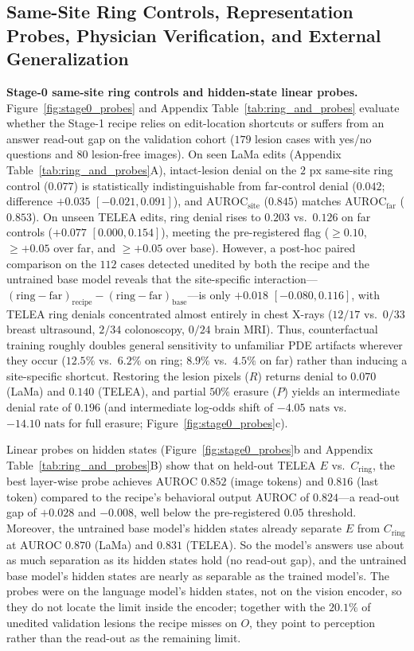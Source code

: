 \documentclass[5p,times,twocolumn,authoryear]{elsarticle}
\begin{document}
\subsection{Same-Site Ring Controls, Representation Probes, Physician Verification, and External Generalization}
\label{subsec:exp_probes_readers_failures}
\textbf{Stage-0 same-site ring controls and hidden-state linear probes.} Figure~\ref{fig:stage0_probes} and Appendix Table~\ref{tab:ring_and_probes} evaluate whether the Stage-1 recipe relies on edit-location shortcuts or suffers from an answer read-out gap on the validation cohort ($179$ lesion cases with yes/no questions and $80$ lesion-free images). On seen LaMa edits (Appendix Table~\ref{tab:ring_and_probes}A), intact-lesion denial on the $2\text{ px}$ same-site ring control ($0.077$) is statistically indistinguishable from far-control denial ($0.042$; difference $+0.035$ $[-0.021, 0.091]$), and $\text{AUROC}_{\text{site}}$ ($0.845$) matches $\text{AUROC}_{\text{far}}$ ($0.853$). On unseen TELEA edits, ring denial rises to $0.203$ vs.\ $0.126$ on far controls ($+0.077$ $[0.000, 0.154]$), meeting the pre-registered flag ($\ge 0.10$, $\ge +0.05$ over far, and $\ge +0.05$ over base). However, a post-hoc paired comparison on the $112$ cases detected unedited by both the recipe and the untrained base model reveals that the site-specific interaction---$(\text{ring} - \text{far})_{\text{recipe}} - (\text{ring} - \text{far})_{\text{base}}$---is only $+0.018$ $[-0.080, 0.116]$, with TELEA ring denials concentrated almost entirely in chest X-rays ($12/17$ vs.\ $0/33$ breast ultrasound, $2/34$ colonoscopy, $0/24$ brain MRI). Thus, counterfactual training roughly doubles general sensitivity to unfamiliar PDE artifacts wherever they occur ($12.5\%$ vs.\ $6.2\%$ on ring; $8.9\%$ vs.\ $4.5\%$ on far) rather than inducing a site-specific shortcut. Restoring the lesion pixels ($R$) returns denial to $0.070$ (LaMa) and $0.140$ (TELEA), and partial $50\%$ erasure ($P$) yields an intermediate denial rate of $0.196$ (and intermediate log-odds shift of $-4.05\text{ nats}$ vs.\ $-14.10\text{ nats}$ for full erasure; Figure~\ref{fig:stage0_probes}c).

Linear probes on hidden states (Figure~\ref{fig:stage0_probes}b and Appendix Table~\ref{tab:ring_and_probes}B) show that on held-out TELEA $E$ vs.\ $C_{\text{ring}}$, the best layer-wise probe achieves $\text{AUROC } 0.852$ (image tokens) and $0.816$ (last token) compared to the recipe's behavioral output AUROC of $0.824$---a read-out gap of $+0.028$ and $-0.008$, well below the pre-registered $0.05$ threshold. Moreover, the untrained base model's hidden states already separate $E$ from $C_{\text{ring}}$ at $\text{AUROC } 0.870$ (LaMa) and $0.831$ (TELEA). So the model's answers use about as much separation as its hidden states hold (no read-out gap), and the untrained base model's hidden states are nearly as separable as the trained model's. The probes were on the language model's hidden states, not on the vision encoder, so they do not locate the limit inside the encoder; together with the $20.1\%$ of unedited validation lesions the recipe misses on $O$, they point to perception rather than the read-out as the remaining limit.
\end{document}
